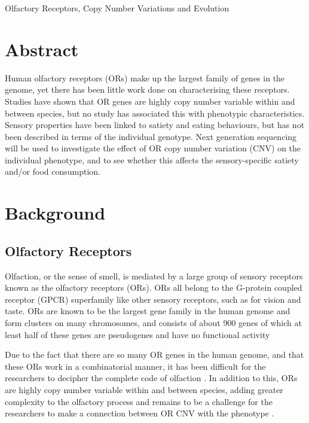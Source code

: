 \documentclass[a4paper, 12pt]{article}
\begin{document}
\begin{center}
\Large{Olfactory Receptors, Copy Number Variations and Evolution}
\end{center}

\section*{Abstract}

Human olfactory receptors (ORs) make up the largest family of genes in the genome, yet there has been little work done on characterising these receptors.
Studies have shown that OR genes are highly copy number variable within and between species, but no study has associated this with phenotypic characteristics.
Sensory properties have been linked to satiety and eating behaviours, but has not been described in terms of the individual genotype.
Next generation sequencing will be used to investigate the effect of OR copy number variation (CNV) on the individual phenotype, and to see whether this affects the sensory-specific satiety and/or food consumption.

\section*{Background}

\subsection*{Olfactory Receptors}

Olfaction, or the sense of smell, is mediated by a large group of sensory receptors known as the olfactory receptors (ORs).
ORs all belong to the G-protein coupled receptor (GPCR) superfamily like other sensory receptors, such as for vision and taste.
ORs are known to be the largest gene family in the human genome and form clusters on many chromosomes, and consists of about 900 genes of which at least half of these genes are pseudogenes and have no functional activity \citep{Glusman2001,Niimura2005}

Due to the fact that there are so many OR genes in the human genome, and that these ORs work in a combinatorial manner, it has been difficult for the researchers to decipher the complete code of olfaction \citep{Hasin-Brumshtein2009, Nei2008}.
In addition to this, ORs are highly copy number variable within and between species, adding greater complexity to the olfactory process and remains to be a challenge for the researchers to make a connection between OR CNV with the phenotype \citep{Nozawa2007}.
\end{document}

